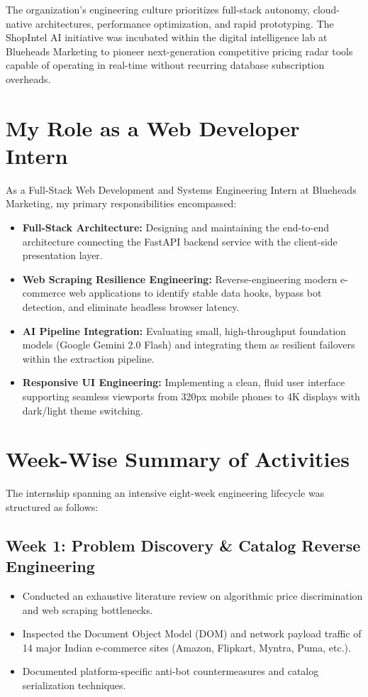 \documentclass[12pt,a4paper,oneside]{report}
\begin{document}
The organization's engineering culture prioritizes full-stack autonomy, cloud-native architectures, performance optimization, and rapid prototyping. The ShopIntel AI initiative was incubated within the digital intelligence lab at Blueheads Marketing to pioneer next-generation competitive pricing radar tools capable of operating in real-time without recurring database subscription overheads.

\section{My Role as a Web Developer Intern}
As a Full-Stack Web Development and Systems Engineering Intern at Blueheads Marketing, my primary responsibilities encompassed:
\begin{itemize}
    \item \textbf{Full-Stack Architecture:} Designing and maintaining the end-to-end architecture connecting the FastAPI backend service with the client-side presentation layer.
    \item \textbf{Web Scraping Resilience Engineering:} Reverse-engineering modern e-commerce web applications to identify stable data hooks, bypass bot detection, and eliminate headless browser latency.
    \item \textbf{AI Pipeline Integration:} Evaluating small, high-throughput foundation models (Google Gemini 2.0 Flash) and integrating them as resilient failovers within the extraction pipeline.
    \item \textbf{Responsive UI Engineering:} Implementing a clean, fluid user interface supporting seamless viewports from 320px mobile phones to 4K displays with dark/light theme switching.
\end{itemize}

\section{Week-Wise Summary of Activities}
The internship spanning an intensive eight-week engineering lifecycle was structured as follows:

\subsection{Week 1: Problem Discovery \& Catalog Reverse Engineering}
\begin{itemize}
    \item Conducted an exhaustive literature review on algorithmic price discrimination and web scraping bottlenecks.
    \item Inspected the Document Object Model (DOM) and network payload traffic of 14 major Indian e-commerce sites (Amazon, Flipkart, Myntra, Puma, etc.).
    \item Documented platform-specific anti-bot countermeasures and catalog serialization techniques.
\end{itemize}
\end{document}

